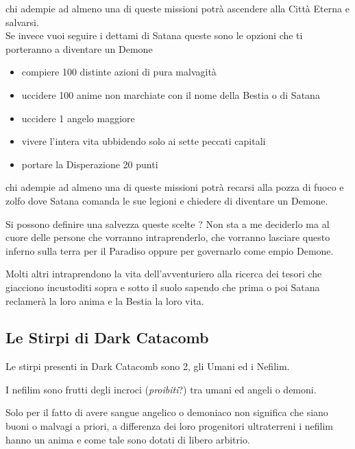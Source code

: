 \documentclass[a4paper,twoside,openany]{book}
\begin{document}
\begin{multicols}{2}
\begin{itemize}
\end{itemize}

chi adempie ad almeno una di queste missioni potrà ascendere alla Città Eterna e salvarsi.\\

Se invece vuoi seguire i dettami di Satana queste sono le opzioni che ti porteranno a diventare un Demone

\begin{itemize}

\item compiere 100 distinte azioni di pura malvagità
\item uccidere 100 anime non marchiate con il nome della Bestia o di Satana
\item uccidere 1 angelo maggiore
\item vivere l'intera vita ubbidendo solo ai sette peccati capitali
\item portare la Disperazione 20 punti

\end{itemize}

chi adempie ad almeno una di queste missioni potrà recarsi alla pozza di fuoco e zolfo dove Satana comanda le sue legioni e chiedere di diventare un Demone.

Si possono definire una salvezza queste scelte ? Non sta a me deciderlo ma al cuore delle persone che vorranno intraprenderlo, che vorranno lasciare questo inferno sulla terra per il Paradiso oppure per governarlo come empio Demone.

Molti altri intraprendono la vita dell'avventuriero alla ricerca dei tesori che giacciono incustoditi sopra e sotto il suolo sapendo che prima o poi Satana reclamerà la loro anima e la Bestia la loro vita.

\subsection{Le Stirpi di Dark Catacomb}

Le stirpi presenti in Dark Catacomb sono 2, gli Umani ed i Nefilim.

I nefilim sono frutti degli incroci (\textit{proibiti}?) tra umani ed angeli o demoni.

Solo per il fatto di avere sangue angelico o demoniaco non significa che siano buoni o malvagi a priori, a differenza dei loro progenitori ultraterreni i nefilim hanno un anima e come tale sono dotati di libero arbitrio.


\end{multicols}
\end{document}
